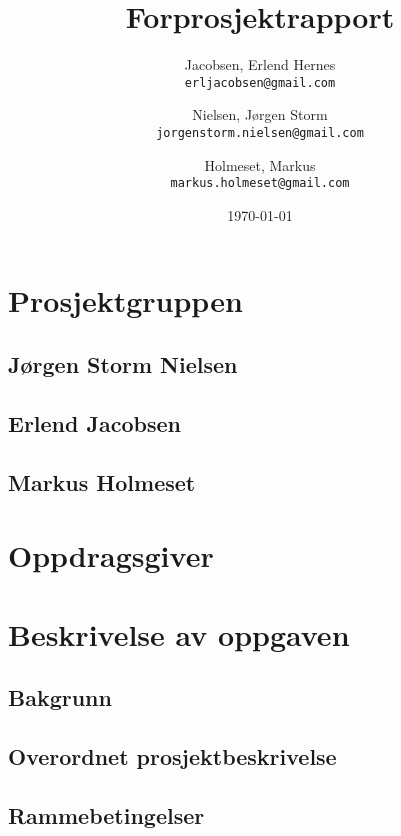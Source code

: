 \documentclass[norsk,a4paper,12pt]{article}
\begin{document}
\author{
	Jacobsen, Erlend Hernes\\
	\texttt{erljacobsen@gmail.com}
	\and
	Nielsen, Jørgen Storm\\
	\texttt{jorgenstorm.nielsen@gmail.com}
	\and
	Holmeset, Markus\\
	\texttt{markus.holmeset@gmail.com}
}
\title{Forprosjektrapport}
\date{\today}
\maketitle

\newpage

\tableofcontents

\newpage

\section{Prosjektgruppen}

\subsection{Jørgen Storm Nielsen}

\subsection{Erlend Jacobsen}

\subsection{Markus Holmeset}

\section{Oppdragsgiver}

\section{Beskrivelse av oppgaven}

\subsection{Bakgrunn}

\subsection{Overordnet prosjektbeskrivelse}

\subsection{Rammebetingelser}
\end{document}
